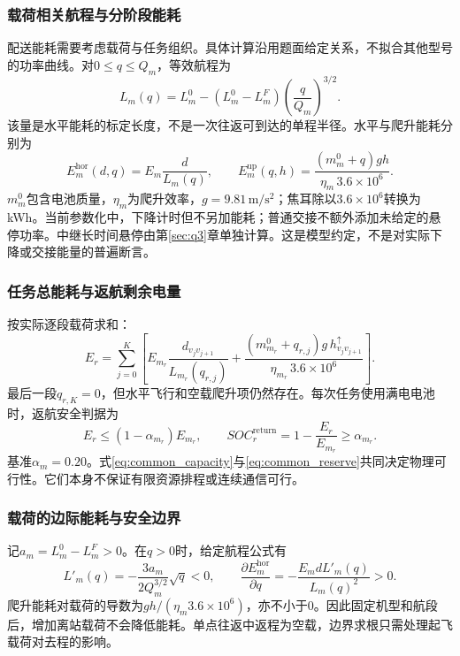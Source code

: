 \documentclass[withoutpreface,colorprint]{format}
\numberwithin{equation}{section}
\numberwithin{figure}{section}
\numberwithin{table}{section}
\begin{document}
\subsubsection{载荷相关航程与分阶段能耗}
配送能耗需要考虑载荷与任务组织\cite{zhang2021energy,zhang2023corrigendum}。具体计算沿用题面给定关系，不拟合其他型号的功率曲线。对$0\le q\le Q_m$，等效航程为
\begin{equation}
 L_m(q)=L_m^0-(L_m^0-L_m^F)\left(\frac q{Q_m}\right)^{3/2}.
\label{eq:common_range}
\end{equation}
该量是水平能耗的标定长度，不是一次往返可到达的单程半径。水平与爬升能耗分别为
\begin{equation}
 E_m^{\mathrm{hor}}(d,q)=E_m\frac d{L_m(q)},\qquad
 E_m^{\mathrm{up}}(q,h)=\frac{(m_m^0+q)gh}{\eta_m\,3.6\times10^6}.
\label{eq:common_energy_parts}
\end{equation}
$m_m^0$包含电池质量，$\eta_m$为爬升效率，$g=9.81\,\mathrm{m/s^2}$；焦耳除以$3.6\times10^6$转换为kWh。当前参数化中，下降计时但不另加能耗；普通交接不额外添加未给定的悬停功率。中继长时间悬停由第\ref{sec:q3}章单独计算。这是模型约定，不是对实际下降或交接能量的普遍断言。

\subsubsection{任务总能耗与返航剩余电量}
按实际逐段载荷求和：
\begin{equation}
 E_r=\sum_{j=0}^{K}\left[
 E_{m_r}\frac{d_{v_jv_{j+1}}}{L_{m_r}(q_{r,j})}
 +\frac{(m_{m_r}^0+q_{r,j})g\,h_{v_jv_{j+1}}^{\uparrow}}{\eta_{m_r}\,3.6\times10^6}\right].
\label{eq:common_task_energy}
\end{equation}
最后一段$q_{r,K}=0$，但水平飞行和空载爬升项仍然存在。每次任务使用满电电池时，返航安全判据为
\begin{equation}
 E_r\le(1-\alpha_{m_r})E_{m_r},\qquad
 SOC_r^{\mathrm{return}}=1-\frac{E_r}{E_{m_r}}\ge\alpha_{m_r}.
\label{eq:common_reserve}
\end{equation}
基准$\alpha_m=0.20$。式\eqref{eq:common_capacity}与\eqref{eq:common_reserve}共同决定物理可行性。它们本身不保证有限资源排程或连续通信可行。


\subsubsection{载荷的边际能耗与安全边界}
记$a_m=L_m^0-L_m^F>0$。在$q>0$时，给定航程公式有
\begin{equation}
L'_m(q)=-\frac{3a_m}{2Q_m^{3/2}}\sqrt q<0,\qquad
\frac{\partial E_m^{\mathrm{hor}}}{\partial q}
=-\frac{E_m dL'_m(q)}{L_m(q)^2}>0.
\label{eq:energy_load_derivative}
\end{equation}
爬升能耗对载荷的导数为$gh/(\eta_m3.6\times10^6)$，亦不小于0。因此固定机型和航段后，增加离站载荷不会降低能耗。单点往返中返程为空载，边界求根只需处理起飞载荷对去程的影响。
\end{document}

